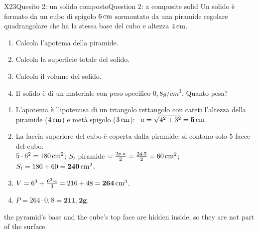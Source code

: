 \begin{esercizio}{X2}{3}{Quesito 2: un solido composto}{Question 2: a composite solid}
Un solido è formato da un cubo di spigolo $6\,\mathrm{cm}$ sormontato da una piramide regolare quadrangolare che ha la stessa base del cubo e altezza $4\,\mathrm{cm}$.
\begin{enumerate}
\item Calcola l'apotema della piramide. 
\item Calcola la superficie totale del solido. 
\item Calcola il volume del solido. 
\item Il solido è di un materiale con peso specifico $0,8\unit{g/cm^3}$. Quanto pesa? 
\end{enumerate}
\begin{center}
\end{center}
\end{esercizio}
\begin{solbox}
\begin{enumerate}
\item L'apotema è l'ipotenusa di un triangolo rettangolo con cateti l'altezza della piramide ($4\,\mathrm{cm}$) e metà spigolo ($3\,\mathrm{cm}$): \ $a=\sqrt{4^2+3^2}=\mathbf{5\,\mathrm{cm}}$.
\item La faccia superiore del cubo è coperta dalla piramide: si contano solo $5$ facce del cubo.\\
$5\cdot6^2=180\,\mathrm{cm^2}$; \quad $S_\ell$ piramide $=\frac{2p\cdot a}{2}=\frac{24\cdot5}{2}=60\,\mathrm{cm^2}$; \quad $S_t=180+60=\mathbf{240\,\mathrm{cm^2}}$.
\item $V=6^3+\frac{6^2\cdot4}{3}=216+48=\mathbf{264\,\mathrm{cm^3}}$.
\item $P=264\cdot0,8=\mathbf{211,2\unit{g}}$.
\end{enumerate}
{the pyramid's base and the cube's top face are hidden inside, so they are not part of the surface.}
\end{solbox}

